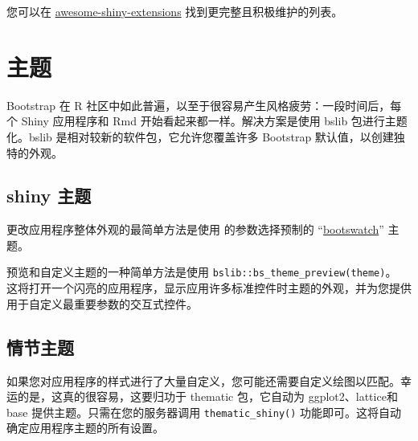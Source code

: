 您可以在 \href{https://github.com/nanxstats/awesome-shiny-extensions}{awesome-shiny-extensions} 找到更完整且积极维护的列表。
\section{主题}
Bootstrap 在 R 社区中如此普遍，以至于很容易产生风格疲劳：一段时间后，每个 Shiny 应用程序和 Rmd 开始看起来都一样。解决方案是使用 bslib 包进行主题化。bslib 是相对较新的软件包，它允许您覆盖许多 Bootstrap 默认值，以创建独特的外观。
\subsection{shiny 主题}
更改应用程序整体外观的最简单方法是使用 的参数选择预制的 “\href{https://bootswatch.com/}{bootswatch}” 主题。

预览和自定义主题的一种简单方法是使用 \verb|bslib::bs_theme_preview(theme)|。 这将打开一个闪亮的应用程序，显示应用许多标准控件时主题的外观，并为您提供用于自定义最重要参数的交互式控件。

\subsection{情节主题}
如果您对应用程序的样式进行了大量自定义，您可能还需要自定义绘图以匹配。幸运的是，这真的很容易，这要归功于 thematic 包，它自动为 ggplot2、lattice和 base 提供主题。只需在您的服务器调用 \verb|thematic_shiny()| 功能即可。这将自动确定应用程序主题的所有设置。